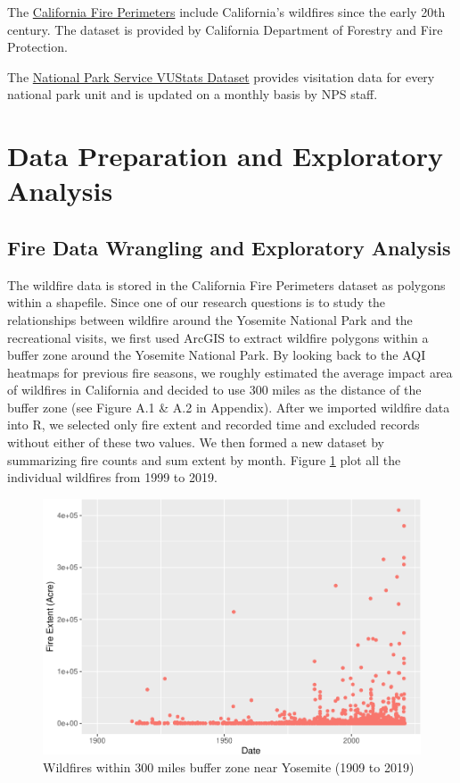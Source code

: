 \documentclass[
  12pt,
]{article}
\begin{document}
The \href{https://gis.data.ca.gov/datasets/CALFIRE-Forestry::california-fire-perimeters-all/explore?location=37.260012\%2C-118.992700\%2C6.00\&showTable=true}{California Fire Perimeters} include California's wildfires since the early 20th century. The dataset is provided by California Department of Forestry and Fire Protection.

The \href{https://irma.nps.gov/STATS/Reports/Park/YOSE}{National Park Service VUStats Dataset} provides visitation data for every national park unit and is updated on a monthly basis by NPS staff.

\hypertarget{data-preparation-and-exploratory-analysis}{%
\section{Data Preparation and Exploratory Analysis}\label{data-preparation-and-exploratory-analysis}}

\hypertarget{fire-data-wrangling-and-exploratory-analysis}{%
\subsection{Fire Data Wrangling and Exploratory Analysis}\label{fire-data-wrangling-and-exploratory-analysis}}

The wildfire data is stored in the California Fire Perimeters dataset as polygons within a shapefile. Since one of our research questions is to study the relationships between wildfire around the Yosemite National Park and the recreational visits, we first used ArcGIS to extract wildfire polygons within a buffer zone around the Yosemite National Park. By looking back to the AQI heatmaps for previous fire seasons, we roughly estimated the average impact area of wildfires in California and decided to use 300 miles as the distance of the buffer zone (see Figure A.1 \& A.2 in Appendix).
After we imported wildfire data into R, we selected only fire extent and recorded time and excluded records without either of these two values. We then formed a new dataset by summarizing fire counts and sum extent by month.
Figure \ref{fig:FireExp1} plot all the individual wildfires from 1999 to 2019.

\begin{figure}

{\centering \includegraphics[width=0.6\linewidth]{CodeFinal_files/figure-latex/FireExp1-1} 

}

\caption{Wildfires within 300 miles buffer zone near Yosemite (1909 to 2019)}\label{fig:FireExp1}
\end{figure}
\end{document}
